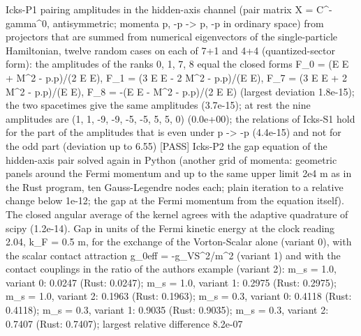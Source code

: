 \documentclass[
  10pt,
]{article}
\newenvironment{Shaded}{}{}
\newcommand{\NormalTok}[1]{#1}
\begin{document}
\begin{Shaded}
\begin{Highlighting}[]
\NormalTok{[PASS] Icks{-}P1  pairing amplitudes in the hidden{-}axis channel (pair matrix X = C\^{}{-} gamma\^{}0, antisymmetric; momenta p, {-}p {-}\textgreater{} p\textquotesingle{}, {-}p\textquotesingle{} in ordinary space) from projectors that are summed from numerical eigenvectors of the single{-}particle Hamiltonian, twelve random cases on each of 7+1 and 4+4 (quantized{-}sector form): the amplitudes of the ranks 0, 1, 7, 8 equal the closed forms F\_0 = (E E\textquotesingle{} + M\^{}2 {-} p.p\textquotesingle{})/(2 E E\textquotesingle{}), F\_1 = (3 E E\textquotesingle{} {-} 2 M\^{}2 {-} p.p\textquotesingle{})/(E E\textquotesingle{}), F\_7 = (3 E E\textquotesingle{} + 2 M\^{}2 {-} p.p\textquotesingle{})/(E E\textquotesingle{}), F\_8 = {-}(E E\textquotesingle{} {-} M\^{}2 {-} p.p\textquotesingle{})/(2 E E\textquotesingle{}) (largest deviation 1.8e{-}15); the two spacetimes give the same amplitudes (3.7e{-}15); at rest the nine amplitudes are (1, 1, {-}9, {-}9, {-}5, {-}5, 5, 5, 0) (0.0e+00); the relations of Icks{-}S1 hold for the part of the amplitudes that is even under p\textquotesingle{} {-}\textgreater{} {-}p\textquotesingle{} (4.4e{-}15) and not for the odd part (deviation up to 6.55)}
\NormalTok{[PASS] Icks{-}P2  the gap equation of the hidden{-}axis pair solved again in Python (another grid of momenta: geometric panels around the Fermi momentum and up to the same upper limit 2e4 m as in the Rust program, ten Gauss{-}Legendre nodes each; plain iteration to a relative change below 1e{-}12; the gap at the Fermi momentum from the equation itself). The closed angular average of the kernel agrees with the adaptive quadrature of scipy (1.2e{-}14). Gap in units of the Fermi kinetic energy at the clock reading 2.04, k\_F = 0.5 m, for the exchange of the Vorton{-}Scalar alone (variant 0), with the scalar contact attraction g\_0eff = {-}g\_VS\^{}2/m\^{}2 (variant 1) and with the contact couplings in the ratio of the author\textquotesingle{}s example (variant 2): m\_s = 1.0, variant 0: 0.0247 (Rust: 0.0247); m\_s = 1.0, variant 1: 0.2975 (Rust: 0.2975); m\_s = 1.0, variant 2: 0.1963 (Rust: 0.1963); m\_s = 0.3, variant 0: 0.4118 (Rust: 0.4118); m\_s = 0.3, variant 1: 0.9035 (Rust: 0.9035); m\_s = 0.3, variant 2: 0.7407 (Rust: 0.7407); largest relative difference 8.2e{-}07}

\end{Highlighting}
\end{Shaded}
\end{document}
